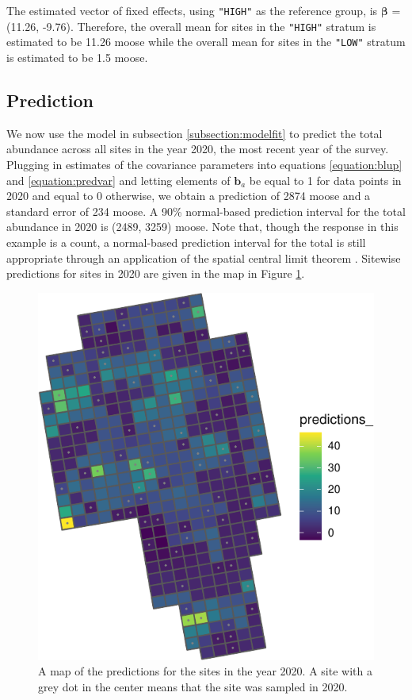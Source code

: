 \documentclass[]{interact}
\theoremstyle{plain}%
\theoremstyle{definition}
\theoremstyle{remark}
\begin{document}
The estimated vector of fixed effects, using \texttt{"HIGH"} as the
reference group, is \(\bm{\beta}\) = (11.26, -9.76). Therefore, the
overall mean for sites in the \texttt{"HIGH"} stratum is estimated to be
11.26 moose while the overall mean for sites in the \texttt{"LOW"}
stratum is estimated to be 1.5 moose.

\subsection{Prediction}

We now use the model in subsection \ref{subsection:modelfit} to predict
the total abundance across all sites in the year 2020, the most recent
year of the survey. Plugging in estimates of the covariance parameters
into equations \ref{equation:blup} and \ref{equation:predvar} and
letting elements of \(\mathbf{b}_a\) be equal to 1 for data points in
2020 and equal to 0 otherwise, we obtain a prediction of 2874 moose and
a standard error of 234 moose. A 90\% normal-based prediction interval
for the total abundance in 2020 is (2489, 3259) moose. Note that, though
the response in this example is a count, a normal-based prediction
interval for the total is still appropriate through an application of
the spatial central limit theorem \citep{smith1980central}. Sitewise
predictions for sites in 2020 are given in the map in Figure
\ref{fig:sitepredmap}.

\begin{figure}
\centering
\includegraphics{fpspatiotemp_manu_files/figure-latex/unnamed-chunk-9-1.pdf}
\caption{\label{fig:sitepredmap} A map of the predictions for the sites
in the year 2020. A site with a grey dot in the center means that the
site was sampled in 2020.}
\end{figure}
\end{document}

